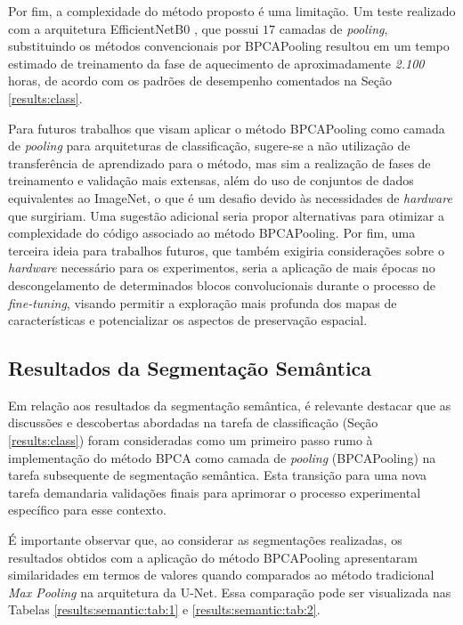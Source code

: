 Por fim, a complexidade do método proposto é uma limitação. Um teste realizado com a arquitetura EfficientNetB0 \citep{Tan2019Efficientnet:Networks}, que possui $17$ camadas de \textit{pooling}, substituindo os métodos convencionais por BPCAPooling resultou em um tempo estimado de treinamento da fase de aquecimento de aproximadamente \textit{2.100} horas, de acordo com os padrões de desempenho comentados na Seção \ref{results:class}.

Para futuros trabalhos que visam aplicar o método BPCAPooling como camada de \textit{pooling} para arquiteturas de classificação, sugere-se a não utilização de transferência de aprendizado para o método, mas sim a realização de fases de treinamento e validação mais extensas, além do uso de conjuntos de dados equivalentes ao ImageNet, o que é um desafio devido às necessidades de \textit{hardware} que surgiriam. Uma sugestão adicional seria propor alternativas para otimizar a complexidade do código associado ao método BPCAPooling. Por fim, uma terceira ideia para trabalhos futuros, que também exigiria considerações sobre o \textit{hardware} necessário para os experimentos, seria a aplicação de mais épocas no descongelamento de determinados blocos convolucionais durante o processo de \textit{fine-tuning}, visando permitir a exploração mais profunda dos mapas de características e potencializar os aspectos de preservação espacial.


\subsection{Resultados da Segmentação Semântica}
\label{results:semantic}
Em relação aos resultados da segmentação semântica, é relevante destacar que as discussões e descobertas abordadas na tarefa de classificação (Seção \ref{results:class}) foram consideradas como um primeiro passo rumo à implementação do método BPCA como camada de \textit{pooling} (BPCAPooling) na tarefa subsequente de segmentação semântica. Esta transição para uma nova tarefa demandaria validações finais para aprimorar o processo experimental específico para esse contexto.

É importante observar que, ao considerar as segmentações realizadas, os resultados obtidos com a aplicação do método BPCAPooling apresentaram similaridades em termos de valores quando comparados ao método tradicional \textit{Max Pooling} na arquitetura da U-Net. Essa comparação pode ser visualizada nas Tabelas \ref{results:semantic:tab:1} e \ref{results:semantic:tab:2}.

